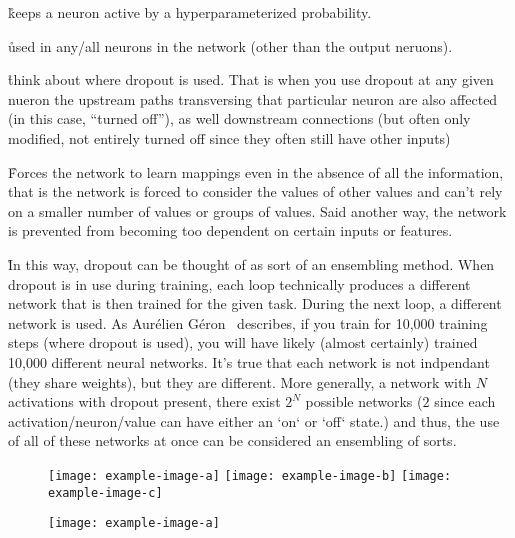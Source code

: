 \r{keeps a neuron active by a hyperparameterized probability.}

\r{used in any/all neurons in the network (other than the output neruons).}

\r{think about where dropout is used. That is when you use dropout at any given nueron the upstream paths transversing that particular neuron are also affected (in this case, ``turned off''), as well downstream connections (but often only modified, not entirely turned off since they often still have other inputs) }

\r{Forces the network to learn mappings even in the absence of all the information, that is the network is forced to consider the values of other values and can't rely on a smaller number of values or groups of values. Said another way, the network is prevented from becoming too dependent on certain inputs or features.}

\r{In this way, dropout can be thought of as sort of an ensembling method. When dropout is in use during training, each loop technically produces a different network that is then trained for the given task. During the next loop, a different network is used. As Aurélien Géron~\cite{geron2019hands} describes, if you train for 10,000 training steps (where dropout is used), you will have likely (almost certainly) trained 10,000 different neural networks. It's true that each network is not indpendant (they share weights), but they are different. More generally, a network with $N$ activations with dropout present, there exist $2^N$ possible networks ($2$ since each activation/neuron/value can have either an `on` or `off` state.) and thus, the use of all of these networks at once can be considered an ensembling of sorts.}




\begin{figure}[htp]
	\centering
	\texttt{[image: example-image-a]}\hfil
	\texttt{[image: example-image-b]}\hfil
	\texttt{[image: example-image-c]}\hfil
	\caption{}
	\label{fig:regularization_dropout_overview_training}
\end{figure}

\begin{figure}[htp]
	\centering
	\texttt{[image: example-image-a]}\hfil
	\caption{}
	\label{fig:regularization_dropout_overview_test}
\end{figure}

